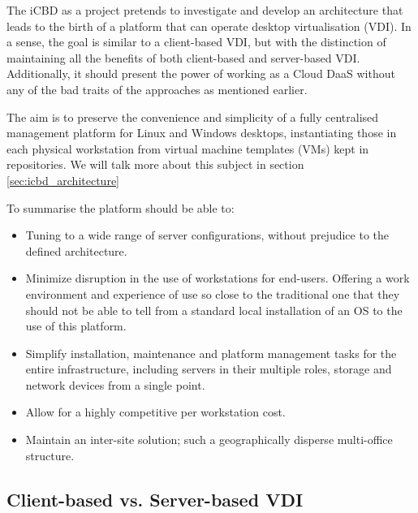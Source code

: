 The iCBD as a project pretends to investigate and develop an architecture that leads to the birth of a platform that can operate desktop virtualisation (\gls{VDI}). In a sense, the goal is similar to a client-based VDI, but with the distinction of maintaining all the benefits of both client-based and server-based VDI. Additionally, it should present the power of working as a Cloud \gls{DaaS} without any of the bad traits of the approaches as mentioned earlier.

The aim is to preserve the convenience and simplicity of a fully centralised management platform for Linux and Windows desktops, instantiating those in each physical workstation from virtual machine templates (VMs) kept in repositories. We will talk more about this subject in section \ref{sec:icbd_architecture}

To summarise the platform should be able to:

\begin{itemize}
	\item Tuning to a wide range of server configurations, without prejudice to the defined architecture.
	\item Minimize disruption in the use of workstations for end-users. Offering a work environment and experience of use so close to the traditional one that they should not be able to tell from a standard local installation of an \gls{OS} to the use of this platform.
	\item Simplify installation, maintenance and platform management tasks for the entire infrastructure, including servers in their multiple roles, storage and network devices from a single point.
	\item Allow for a highly competitive per workstation cost.
	\item Maintain an inter-site solution; such a geographically disperse multi-office structure.
\end{itemize}

\subsection{Client-based vs. Server-based VDI}
\label{sub:icbd_concept_vdi}


